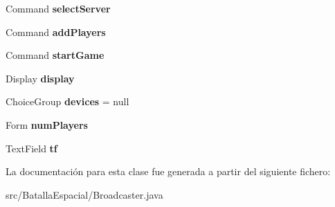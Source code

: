 \begin{DoxyCompactItemize}
\item 
\hypertarget{classBatallaEspacial_1_1Broadcaster_a24e14f55a138cc92d22b3a83ec0762a8}{
Command {\bfseries selectServer}}
\label{classBatallaEspacial_1_1Broadcaster_a24e14f55a138cc92d22b3a83ec0762a8}

\item 
\hypertarget{classBatallaEspacial_1_1Broadcaster_a1f9171f7cb03048bda0c1435de26ac12}{
Command {\bfseries addPlayers}}
\label{classBatallaEspacial_1_1Broadcaster_a1f9171f7cb03048bda0c1435de26ac12}

\item 
\hypertarget{classBatallaEspacial_1_1Broadcaster_ae007b526e1ec7cb217f766c4f8521c73}{
Command {\bfseries startGame}}
\label{classBatallaEspacial_1_1Broadcaster_ae007b526e1ec7cb217f766c4f8521c73}

\item 
\hypertarget{classBatallaEspacial_1_1Broadcaster_ae2adb35eb82cf97decf600ae0ff2569c}{
Display {\bfseries display}}
\label{classBatallaEspacial_1_1Broadcaster_ae2adb35eb82cf97decf600ae0ff2569c}

\item 
\hypertarget{classBatallaEspacial_1_1Broadcaster_a8b05c8f8ff686562dee26dc6d4c37033}{
ChoiceGroup {\bfseries devices} = null}
\label{classBatallaEspacial_1_1Broadcaster_a8b05c8f8ff686562dee26dc6d4c37033}

\item 
\hypertarget{classBatallaEspacial_1_1Broadcaster_abe842b0798e7045fe483260eea594931}{
Form {\bfseries numPlayers}}
\label{classBatallaEspacial_1_1Broadcaster_abe842b0798e7045fe483260eea594931}

\item 
\hypertarget{classBatallaEspacial_1_1Broadcaster_a9069756443074c74c46f5c2b9d27d5dc}{
TextField {\bfseries tf}}
\label{classBatallaEspacial_1_1Broadcaster_a9069756443074c74c46f5c2b9d27d5dc}

\end{DoxyCompactItemize}


La documentación para esta clase fue generada a partir del siguiente fichero:\begin{DoxyCompactItemize}
\item 
src/BatallaEspacial/Broadcaster.java\end{DoxyCompactItemize}
